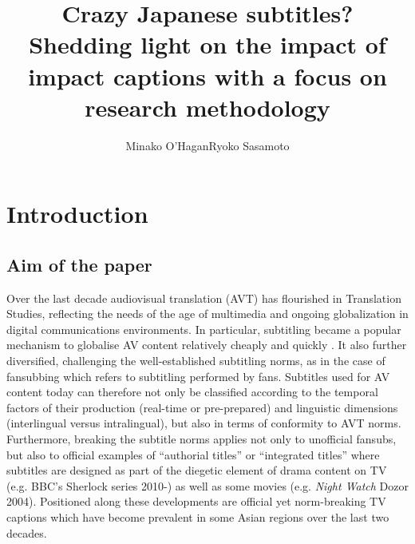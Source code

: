 \documentclass[output=paper]{langsci/langscibook}
\title{Crazy {Japanese} subtitles? {S}hedding light on the impact of impact captions with a focus on research methodology}
\author{Minako O'Hagan\lastand Ryoko Sasamoto\affiliation{Dublin City University}
}
\begin{document}
 
\section{Introduction}

\subsection{Aim of the paper}

Over the last decade audiovisual translation (AVT) has flourished in Translation Studies, reflecting the needs of the age of multimedia and ongoing globalization in digital communications environments. In particular, subtitling became a popular mechanism to globalise AV content relatively cheaply and quickly \citep[274]{diaz2013}. It also further diversified, challenging the well-established subtitling norms, as in the case of fansubbing which refers to subtitling performed by fans. Subtitles used for AV content today can therefore not only be classified according to the temporal factors of their production (real-time or pre-prepared) and linguistic dimensions (interlingual versus intralingual), but also in terms of conformity to AVT norms.   Furthermore, breaking the subtitle norms applies not only to unofficial fansubs, but also to official examples of ``authorial titles'' \citep{perezgonzalez2012} or ``integrated titles'' \citep{Fox2013} where subtitles are designed as part of the diegetic element of drama content on TV (e.g. BBC's Sherlock series 2010-) as well as some movies (e.g. \textit{Night Watch} Dozor 2004). Positioned along these developments are official yet norm-breaking TV captions which have become prevalent in some Asian regions over the last two decades.   
\end{document}
